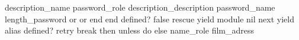 description_name
password_role
description_description
password_name
length_password
or
or
end
end
defined?
false
rescue
yield
module
nil
next
yield
alias
defined?
retry
break
then
unless
do
else
name_role
film_adress
